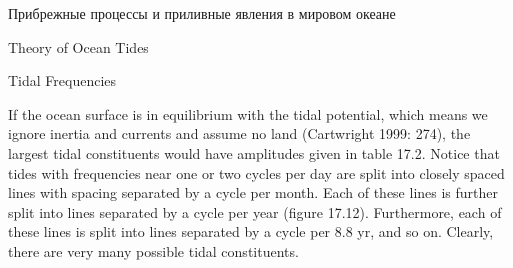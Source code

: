 \begin{chapter}{Прибрежные процессы и приливные явления в мировом океане}
\begin{section}{Theory of Ocean Tides}
\begin{paragraph}{Tidal Frequencies}

If the ocean surface is in equilibrium
with the tidal potential, which means we ignore inertia and currents
and assume no land (Cartwright 1999: 274), the largest tidal
constituents would have amplitudes given in table 17.2. Notice that
tides with frequencies near one or two cycles per day are split into
closely spaced lines with spacing separated by a cycle per month. Each
of these lines is further split into lines separated by a cycle per
year (figure 17.12). Furthermore, each of these lines is split into
lines separated by a cycle per 8.8 yr, and so on. Clearly, there are
very many possible tidal constituents.
%


\end{paragraph}
\end{section}
\end{chapter}
